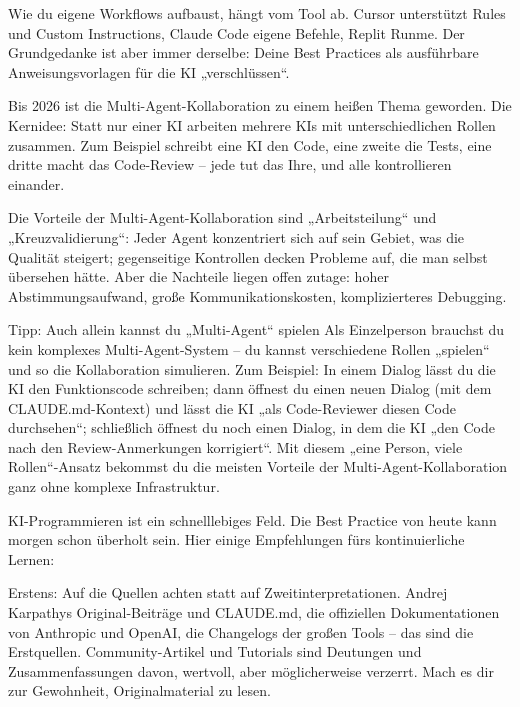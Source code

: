 Wie du eigene Workflows aufbaust, hängt vom Tool ab. Cursor unterstützt Rules und Custom Instructions, Claude Code eigene Befehle, Replit Runme. Der Grundgedanke ist aber immer derselbe: Deine Best Practices als ausführbare Anweisungsvorlagen für die KI „verschlüssen“.


Bis 2026 ist die Multi-Agent-Kollaboration zu einem heißen Thema geworden. Die Kernidee: Statt nur einer KI arbeiten mehrere KIs mit unterschiedlichen Rollen zusammen. Zum Beispiel schreibt eine KI den Code, eine zweite die Tests, eine dritte macht das Code-Review – jede tut das Ihre, und alle kontrollieren einander.

Die Vorteile der Multi-Agent-Kollaboration sind „Arbeitsteilung“ und „Kreuzvalidierung“: Jeder Agent konzentriert sich auf sein Gebiet, was die Qualität steigert; gegenseitige Kontrollen decken Probleme auf, die man selbst übersehen hätte. Aber die Nachteile liegen offen zutage: hoher Abstimmungsaufwand, große Kommunikationskosten, komplizierteres Debugging.

\begin{tcbinfo}{Tipp: Auch allein kannst du „Multi-Agent“ spielen}
Als Einzelperson brauchst du kein komplexes Multi-Agent-System – du kannst verschiedene Rollen „spielen“ und so die Kollaboration simulieren. Zum Beispiel: In einem Dialog lässt du die KI den Funktionscode schreiben; dann öffnest du einen neuen Dialog (mit dem CLAUDE.md-Kontext) und lässt die KI „als Code-Reviewer diesen Code durchsehen“; schließlich öffnest du noch einen Dialog, in dem die KI „den Code nach den Review-Anmerkungen korrigiert“. Mit diesem „eine Person, viele Rollen“-Ansatz bekommst du die meisten Vorteile der Multi-Agent-Kollaboration ganz ohne komplexe Infrastruktur.

\end{tcbinfo}


KI-Programmieren ist ein schnelllebiges Feld. Die Best Practice von heute kann morgen schon überholt sein. Hier einige Empfehlungen fürs kontinuierliche Lernen:

Erstens: Auf die Quellen achten statt auf Zweitinterpretationen. Andrej Karpathys Original-Beiträge und CLAUDE.md, die offiziellen Dokumentationen von Anthropic und OpenAI, die Changelogs der großen Tools – das sind die Erstquellen. Community-Artikel und Tutorials sind Deutungen und Zusammenfassungen davon, wertvoll, aber möglicherweise verzerrt. Mach es dir zur Gewohnheit, Originalmaterial zu lesen.

